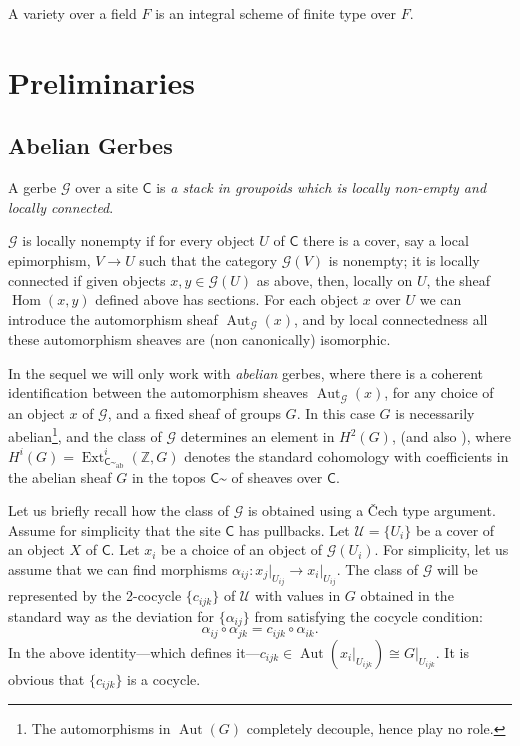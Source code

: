 \documentclass{amsart}
\numberwithin{equation}{subsection}
\theoremstyle{remark}
\theoremstyle{remark}
\newcommand{\cG}{\mathcal{G}}
\newcommand{\cU}{\mathcal{U}}
\newcommand{\bbZ}{\mathbb{Z}}
\DeclareMathOperator{\Aut}{Aut}
\newcommand{\C}{\mathsf{C}} %
\DeclareMathOperator{\Ext}{Ext}
\DeclareMathOperator{\Hom}{Hom}
\newcommand{\iso}{\cong}
\newcommand{\shC}{\C\sptilde} %
\newcommand{\shAbC}{\shC_\mathrm{ab}} %
\begin{document}
A variety over a field $F$ is an integral scheme of finite type over $F$.
 



\section{Preliminaries}\label{sec:prel}

\subsection{Abelian Gerbes \cite{Giraud,Deligne,Breen94}}
\label{sec:gerbes} 
A gerbe $\cG$ over a site $\C$ is \textit{a stack in groupoids which is locally non-empty and locally connected}.

$\cG$ is locally nonempty if for every object $U$ of $\C$ there is a cover, say a local epimorphism, $V\to U$ such that the category $\cG(V)$ is nonempty; it is locally connected if given objects $x,y\in \cG(U)$ as above, then, locally on $U$, the sheaf $\Hom(x,y)$ defined above has sections. For each object $x$ over $U$ we can introduce the automorphism sheaf $\Aut_\cG(x)$, and by local connectedness all these automorphism sheaves are (non canonically) isomorphic.

In the sequel we will only work with \emph{abelian} gerbes, where there is a coherent identification between the automorphism sheaves $\Aut_\cG(x)$, for any choice of an object $x$ of $\cG$, and a fixed sheaf of groups $G$. In this case $G$ is necessarily abelian\footnote{The automorphisms in $\Aut(G)$ completely decouple, hence play no role.}, and the class of $\cG$ determines an element in $H^2(G)$, \cite[\S 2]{Breen94} (and also \cite{jardine}), where $H^i(G)=\Ext^i_{\shAbC}(\bbZ,G)$ denotes the standard cohomology with coefficients in the abelian sheaf $G$ in the topos $\shC$ of sheaves over $\C$.

Let us briefly recall how the class of $\cG$ is obtained using a \v{C}ech type argument. Assume for simplicity that the site $\C$ has pullbacks. Let $\cU=\{U_i\}$ be a cover of an object $X$ of $\C$. Let $x_i$ be a choice of an object of $\cG(U_i)$. For simplicity, let us assume that we can find morphisms $\alpha_{ij}\colon x_j\rvert_{U_{ij}}\to x_i\rvert_{U_{ij}}$. The class of $\cG$ will be represented by the 2-cocycle $\{c_{ijk}\}$ of $\cU$ with values in $G$ obtained in the standard way as the deviation for $\{\alpha_{ij}\}$ from satisfying the cocycle condition:
\begin{equation*}
  \alpha_{ij}\circ \alpha_{jk} = c_{ijk}\circ \alpha_{ik}.
\end{equation*}
In the above identity---which defines it---$c_{ijk}\in \Aut(x_i\rvert_{U_{ijk}})\iso G\rvert_{U_{ijk}}$. It is obvious that  $\{c_{ijk}\}$ is a cocycle.
\end{document}
